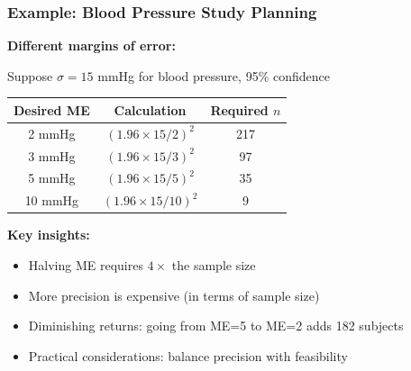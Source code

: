 \documentclass{beamer}
\begin{document}
\begin{frame}
\frametitle{Example: Blood Pressure Study Planning}
\textbf{Different margins of error:}

\vspace{0.3cm}
Suppose $\sigma = 15$ mmHg for blood pressure, 95\% confidence

\vspace{0.3cm}
\begin{center}
\begin{tabular}{ccc}
\toprule
Desired ME & Calculation & Required $n$ \\
\midrule
2 mmHg & $(1.96 \times 15 / 2)^2$ & 217 \\
3 mmHg & $(1.96 \times 15 / 3)^2$ & 97 \\
5 mmHg & $(1.96 \times 15 / 5)^2$ & 35 \\
10 mmHg & $(1.96 \times 15 / 10)^2$ & 9 \\
\bottomrule
\end{tabular}
\end{center}

\vspace{0.5cm}
\textbf{Key insights:}
\begin{itemize}
\item Halving ME requires $4\times$ the sample size
\item More precision is expensive (in terms of sample size)
\item Diminishing returns: going from ME=5 to ME=2 adds 182 subjects
\item Practical considerations: balance precision with feasibility
\end{itemize}
\end{frame}
\end{document}
